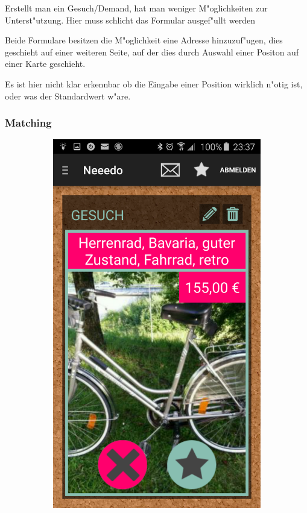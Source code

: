 Erstellt man ein Gesuch/Demand, hat man weniger M"oglichkeiten zur Unterst"utzung. 
Hier muss schlicht das Formular ausgef"ullt werden

Beide Formulare besitzen die M"oglichkeit eine Adresse hinzuzuf"ugen, dies geschieht auf einer weiteren Seite, auf der dies durch Auswahl einer Positon auf einer Karte geschieht.

Es ist hier nicht klar erkennbar ob die Eingabe einer Position wirklich n"otig ist, oder was der Standardwert w"are.
 
\subsubsection{Matching}
\begin{figure}[H]
 
\begin{subfigure}{0.5\textwidth}
\includegraphics[width=0.9\linewidth]{./Bilder/matching1.png} 

\end{subfigure}
\end{figure}
